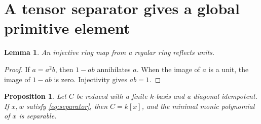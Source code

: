 \documentclass[11pt]{article}
\newtheorem{proposition}[theorem]{Proposition}
\newtheorem{lemma}[theorem]{Lemma}
\theoremstyle{definition}
\theoremstyle{remark}
\begin{document}
\section{A tensor separator gives a global primitive element}

\begin{lemma}\label{lem:reflect-units}
An injective ring map from a regular ring reflects units.
\end{lemma}
\begin{proof}
If $a=a^2b$, then $1-ab$ annihilates $a$. When the image of $a$
is a unit, the image of $1-ab$ is zero. Injectivity gives $ab=1$.
\end{proof}

\begin{proposition}\label{prop:global-generator}
Let $C$ be reduced with a finite $k$-basis and a diagonal idempotent.
If $x,w$ satisfy \eqref{eq:separator}, then $C=k[x]$, and the minimal
monic polynomial of $x$ is separable.
\end{proposition}
\end{document}
